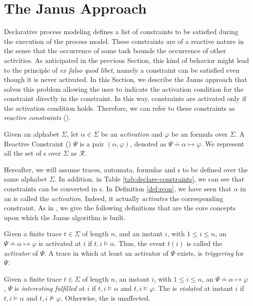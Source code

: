 \section{The Janus Approach}\label{sec:janus}
Declarative process modeling defines a list of \declare constraints to be satisfied during the execution of the process model. These constraints are of a reactive nature in the sense that the occurrence of some task bounds the occurrence of other activities. As anticipated in the previous Section, this kind of behavior might lead to the principle of \textit{ex falso quod libet}, namely a constraint can be satisfied even though it is never activated. In this Section, we describe the Janus approach \citep{cecconi2018interestingness} that solves this problem allowing the user to indicate the activation condition for the constraint directly in the constraint. In this way, constraints are activated only if the activation condition holds. Therefore, we can refer to these constraints as \textit{reactive constraints} (\rcon).
\begin{definition}\label{def:rcon}
Given an alphabet $\Sigma$, let $\alpha \in \Sigma$ be an \emph{activation} and $\varphi$ be an \LTLp formula over $\Sigma$. A Reactive Constraint (\rcon) $\Psi$ is a pair $(\alpha, \varphi)$, denoted as $\Psi \doteq \alpha  \mapsto \varphi$. We represent all the set of \rcon s over $\Sigma$ as $\mathcal{R}$.
\end{definition}
Hereafter, we will assume traces, automata, \LTLp formulas and \rcon s to be defined over the same alphabet $\Sigma$. In addition, in Table \ref{tab:declare-constraints}, we can see that \declare constraints can be converted in \rcon s. In Definition \ref{def:rcon}, we have seen that $\alpha$ in an \rcon\xspace is called the \emph{activation}. Indeed, it actually \emph{activates} the corresponding constraint. As in \cite{cecconi2018interestingness}, we give the following definitions that are the core concepts upon which the Janus algorithm is built.
\begin{definition}\label{def:activator}
Given a finite trace $t \in \Sigma$ of length $n$, and an instant $i$, with $1 \le i \le n$, an \rcon\xspace $\Psi \doteq \alpha  \mapsto \varphi$ is activated at $i$ if $t,i \models \alpha$. Thus, the event $t(i)$ is called the \emph{activator} of $\Psi$. A trace in which at least an activator of $\Psi$ exists, is \emph{triggering} for $\Psi$.
\end{definition}

\begin{definition}\label{def:interesting-fulfilment}
Given a finite trace $t \in \Sigma$ of length $n$, an instant $i$, with $1 \le i \le n$, an \rcon\xspace $\Psi \doteq \alpha  \mapsto \varphi$, $\Psi$ is \emph{interesting fulfilled} at $i$ if $t,i \models \alpha$ and $t,i \models \varphi$. The \rcon\xspace is \emph{violated} at instant $i$ if $t,i \models \alpha$ and $t,i \not\models \varphi$. Otherwise, the \rcon\xspace is unaffected.
\end{definition}

